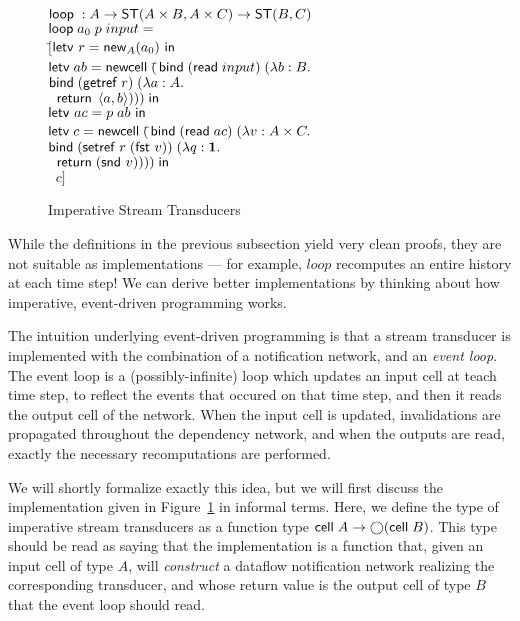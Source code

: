 \documentclass[preprint,natbib]{sigplanconf}
\begin{document}
\begin{figure}
\begin{tabbing}
$\mbox{\textsf{{loop}}}\; : A \to \mbox{\textsf{{ST}}}({A\times B}, {A\times C}) \to \mbox{\textsf{{ST}}}({B}, {C})$ \\
$\mbox{\textsf{{loop}}}\; a_0\; p \; input = $ \\
\;\;$[$\=$\mbox{\textsf{{letv }}}r = \mbox{\textsf{{new}}}_{A}(a_0)\mbox{\textsf{{ in }}}$ \\
    \>$\mbox{\textsf{{letv}}}\; ab = \mbox{\textsf{{newcell}}}\; ($\=$\mbox{\textsf{{bind}}}\; (\mbox{\textsf{{read}}}\; input)\; (\lambda b:B.$ \\
    \>                                \>$\mbox{\textsf{{bind}}}\; (\mbox{\textsf{{getref}}}\; r)\;       (\lambda a:A.$ \\
    \>                                \>$\;\; \mbox{\textsf{{return}}}\; \left<{a},{b}\right>))) \;\mbox{\textsf{{in}}}$ \\
    \>$\mbox{\textsf{{letv }}}ac = p\;ab\mbox{\textsf{{ in }}}$ \\
    \>$\mbox{\textsf{{letv}}}\;c = \mbox{\textsf{{newcell}}}\; ($\=$\mbox{\textsf{{bind}}}\; (\mbox{\textsf{{read}}}\; ac) \;(\lambda v:A \times C.$ \\
    \>                              \>$\mbox{\textsf{{bind}}}\; (\mbox{\textsf{{setref}}}\; r\;(\mbox{\textsf{{fst }}} v)) \;(\lambda q:\mathbf{1}.$ \\
    \>                              \>$\;\;\mbox{\textsf{{return}}}\; (\mbox{\textsf{{snd }}} v))))\;\mbox{\textsf{{in}}}$ \\
    \>$\;\;c]$ 
\end{tabbing}
\caption{Imperative Stream Transducers}
\label{imperative-transducer-semantics}
\end{figure}

While the definitions in the previous subsection yield very clean
proofs, they are not suitable as implementations --- for example,
$loop$ recomputes an entire history at each time step! We can derive
better implementations by thinking about how imperative, event-driven
programming works.

The intuition underlying event-driven programming is that a stream
transducer is implemented with the combination of a notification
network, and an \emph{event loop}.  The event loop is a
(possibly-infinite) loop which updates an input cell at teach time
step, to reflect the events that occured on that time step, and then
it reads the output cell of the network. When the input cell is
updated, invalidations are propagated throughout the dependency
network, and when the outputs are read, exactly the necessary
recomputations are performed.

We will shortly formalize exactly this idea, but we will first discuss
the implementation given in
Figure~\ref{imperative-transducer-semantics} in informal terms. Here,
we define the type of imperative stream transducers as a function type
$\mbox{\textsf{{cell}}}\;{A} \to \bigcirc{(\mbox{\textsf{{cell}}}\;{B})}$. This type should be read as
saying that the implementation is a function that, given an input cell
of type $A$, will \emph{construct} a dataflow notification network
realizing the corresponding transducer, and whose return value is the
output cell of type $B$ that the event loop should read. 
\end{document}
